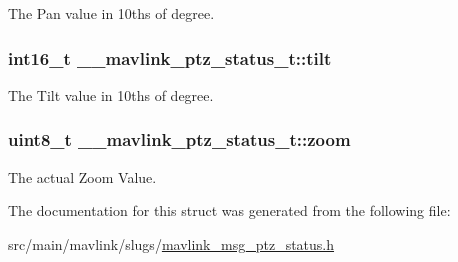 The Pan value in 10ths of degree. 

\hypertarget{struct____mavlink__ptz__status__t_a8cceaab78b9d7e937d2601ec69ab154f}{
\subsubsection[{tilt}]{\setlength{\rightskip}{0pt plus 5cm}int16\+\_\+t \+\_\+\+\_\+mavlink\+\_\+ptz\+\_\+status\+\_\+t\+::tilt}}\label{struct____mavlink__ptz__status__t_a8cceaab78b9d7e937d2601ec69ab154f}


The Tilt value in 10ths of degree. 

\hypertarget{struct____mavlink__ptz__status__t_af4284c7d39478dccf4ad13d1cdd05954}{
\subsubsection[{zoom}]{\setlength{\rightskip}{0pt plus 5cm}uint8\+\_\+t \+\_\+\+\_\+mavlink\+\_\+ptz\+\_\+status\+\_\+t\+::zoom}}\label{struct____mavlink__ptz__status__t_af4284c7d39478dccf4ad13d1cdd05954}


The actual Zoom Value. 



The documentation for this struct was generated from the following file\+:\begin{DoxyCompactItemize}
\item 
src/main/mavlink/slugs/\hyperlink{mavlink__msg__ptz__status_8h}{mavlink\+\_\+msg\+\_\+ptz\+\_\+status.\+h}\end{DoxyCompactItemize}
